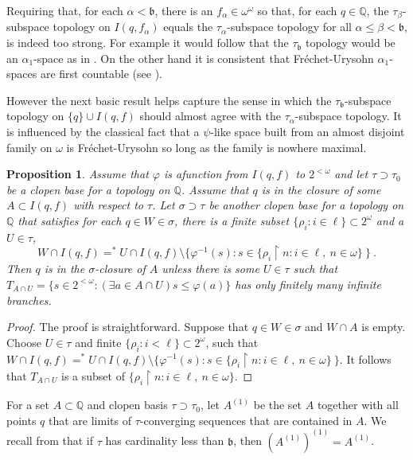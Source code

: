 \documentclass{amsart}
\newtheorem{proposition}[thm]{Proposition}
\theoremstyle{definition}
\theoremstyle{remark}
\begin{document}
Requiring that, for each $\alpha<\mathfrak b$, there is
an $f_\alpha\in\omega^\omega$ so that, for each $q\in \mathbb Q$,
 the $\tau_\beta$-subspace topology on $I(q,f_\alpha)$ equals
 the $\tau_\alpha$-subspace topology for all $\alpha \leq \beta <\mathfrak b$,
  is indeed too strong. For example  it would follow that the $\tau_{\mathfrak b}$
  topology
   would be an $\alpha_1$-space as in \cite{Arh1}. On the other
   hand it is consistent that Fr\'echet-Urysohn $\alpha_1$-spaces
   are first countable (see \cite{DowSteprans}). 

   However the next basic result helps  capture
    the   sense in which the  $\tau_{\mathfrak b}$-subspace topology
   on $\{ q\}\cup I(q,f)$ should   almost agree with   
   the $\tau_\alpha$-subspace topology.  It is influenced
   by the classical fact that a $\psi$-like space built from
   an almost disjoint family on $\omega$ is Fr\'echet-Urysohn
   so long as the family is nowhere maximal.

   \begin{proposition} 
   Assume    that $\varphi$ is a\label{ringRule}  
   function from $I(q,f)$ to $2^{<\omega}$
and let $ \tau\supset\tau_0$ be a clopen base 
for a topology on $\mathbb Q$. Assume that $q$ is in 
the closure of some $A\subset I(q,f)$ with respect to
$\tau$. Let $\sigma\supset  \tau$ be another
clopen base for a topology on $\mathbb Q$ that satisfies
    for each $q\in W\in \sigma$, there is a finite
   subset $\{ \rho_i : i\in\ell\}\subset 2^\omega$ 
   and a $U\in  \tau $,
   $$W\cap I(q,f) =^* U\cap I(q,f) \setminus
     \{ \varphi^{-1}(s) : s\in \{ \rho_i \restriction n: i\in\ell, \ n\in\omega\}~\}~.$$
Then  $q$ is in the $\sigma$-closure of $A$ unless there is some $U\in\tau$
such that 
$T_{A\cap U} = \{  s\in 2^{<\omega} :
 (\exists a \in A\cap U) s \leq \varphi(a)  \}$ has only finitely many
infinite branches.
   \end{proposition}

\begin{proof}   The proof is straightforward. Suppose that $q\in W\in\sigma$
and $W\cap A$ is empty. Choose $U\in \tau$
and finite $\{ \rho_i : i<\ell\}\subset 2^\omega$,
such   that
 $W\cap I(q,f) =^* U\cap I(q,f)\setminus\{ \varphi^{-1}(s): 
  s\in \{ \rho_i \restriction n: i\in\ell, \ n\in\omega\}~\}$. 
  It follows that  $T_{A\cap U} $ is a subset of
  $ \{ \rho_i \restriction n: i\in\ell, \ n\in\omega\}$. 
 \end{proof}

For a set $A\subset\mathbb Q$ and clopen basis $ \tau\supset
\tau_0$, 
let
  $A^{(1)}$ be the set $A$ together with all points
   $q$ that are limits of $  \tau$-converging
   sequences that are contained in $A$. We recall from
   \cite{DowFrechet} that if
   $ \tau$ has cardinality less than
    $\mathfrak b$,  then $\left( A^{(1)}\right)^{(1)}
     = A^{(1)}$.   
 
\end{document}
